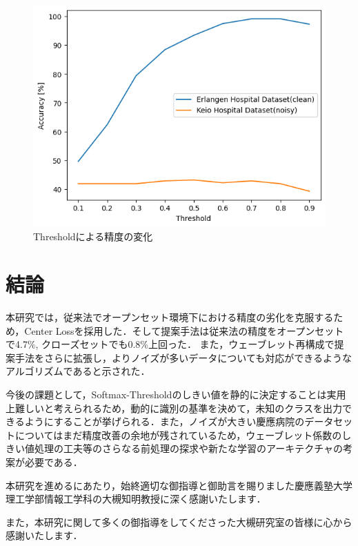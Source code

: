 \begin{figure}[H]
\begin{center}
\includegraphics[width=0.8\linewidth]{./fig/Threshold_comparison.png}
\end{center}
\caption{Thresholdによる精度の変化}
\label{fig:threshold}
\end{figure}


\chapter{結論}
本研究では，従来法でオープンセット環境下における精度の劣化を克服するため，Center Lossを採用した．そして提案手法は従来法の精度をオープンセットで4.7\%, クローズセットでも0.8\%上回った．
また，ウェーブレット再構成で提案手法をさらに拡張し，よりノイズが多いデータについても対応ができるようなアルゴリズムであると示された．

今後の課題として，Softmax-Thresholdのしきい値を静的に決定することは実用上難しいと考えられるため，動的に識別の基準を決めて，未知のクラスを出力できるようにすることが挙げられる．また，ノイズが大きい慶應病院のデータセットについてはまだ精度改善の余地が残されているため，ウェーブレット係数のしきい値処理の工夫等のさらなる前処理の探求や新たな学習のアーキテクチャの考案が必要である．


\begin{acknowledgment}

本研究を進めるにあたり，始終適切な御指導と御助言を賜りました慶應義塾大学理工学部情報工学科の大槻知明教授に深く感謝いたします．

また，本研究に関して多くの御指導をしてくださった大槻研究室の皆様に心から感謝いたします．


\end{acknowledgment}

